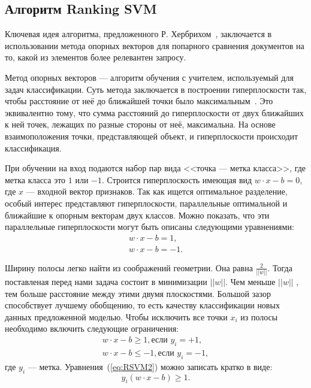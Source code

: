 \subsection{Алгоритм Ranking SVM}

Ключевая идея алгоритма, предложенного Р. Хербрихом~\cite{RankSVM}, заключается в использовании метода опорных векторов для попарного сравнения документов на то, какой из элементов более релевантен запросу. 

Метод опорных векторов --- алгоритм обучения с учителем, используемый для задач классификации. Суть метода заключается в построении гиперплоскости так, чтобы расстояние от неё до ближайшей точки было максимальным~\cite{ML_no_wors}. Это эквивалентно тому, что сумма расстояний до гиперплоскости от двух ближайших к ней точек, лежащих по разные стороны от неё, максимальна. На основе взаимоположения точки, представляющей объект, и гиперплоскости происходит  классификация.

При обучении на вход подаются набор пар вида <<точка --- метка класса>>, где метка класса это $1$ или $-1$. Строится гиперплоскость имеющая вид $w\cdot x - b = 0$, где $x$ ---  входной вектор признаков. Так как ищется оптимальное разделение, особый интерес представляют гиперплоскости, параллельные оптимальной и ближайшие к опорным векторам двух классов. 
Можно показать, что эти параллельные гиперплоскости могут быть описаны следующими уравнениями:
\begin{equation}
		\label{eq:RSVM1}
	\begin{aligned}
		w \cdot x - b = 1,  \\
		w \cdot x - b = - 1 .
	\end{aligned}
\end{equation}

Ширину полосы легко найти из соображений геометрии. Она равна $\frac{2}{||w||}$. Тогда поставленая перед нами задача состоит в минимизации $||w||$. Чем меньше $||w||$ , тем больше расстояние между этими двумя плоскостями. Большой зазор способствует лучшему обобщению, то есть качеству классификации новых данных предложенной моделью. Чтобы исключить все точки $x_i$ из полосы необходимо включить следующие ограничения:
\begin{equation}
	\label{eq:RSVM2}
	\begin{aligned}
	w \cdot x - b \geq 1, \text{если $y_i = +1$},  \\
	w \cdot x - b \leq -1, \text{если $y_i = -1$} ,
	\end{aligned}
\end{equation}
где $y_i$ --- метка.
Уравнения~(\ref{eq:RSVM2}) можно записать кратко в виде:
\begin{equation}
	\label{eq:RSVM3}
	y_i(w \cdot x - b) \geq 1.
\end{equation}

